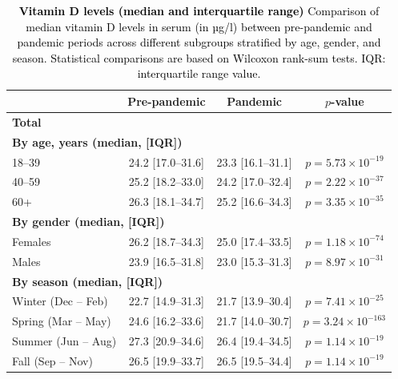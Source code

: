 \documentclass[12pt]{article}
\newcommand{\REV}[1]{\textcolor{black}{#1}}
\begin{document}
\begin{appendices}
\begin{table}[h]
    \centering
\caption[Vitamin D levels (median and interquartile range)]{\REV{\textbf{Vitamin D levels (median and interquartile range)} Comparison of median vitamin D levels in serum (in µg/l) between pre-pandemic and pandemic periods across different subgroups stratified by age, gender, and season. Statistical comparisons are based on Wilcoxon rank-sum tests. IQR: interquartile range value.}}
\label{tab:results_stat_level_median}
    \begin{tabular}{|l|c|c|c|}
    \hline
    \rowcolor{orange!20} & \textbf{Pre-pandemic} & \textbf{Pandemic} & \textbf{$p$-value}\\ \hline 
    \textbf{Total}& & & \\ \hline
    \multicolumn{4}{|l|}{\textbf{By age, years (median, [IQR])}} \\\hline
    18--39 & 24.2 [17.0--31.6] & 23.3 [16.1--31.1] & $p = 5.73 \times 10^{-19}$\\ \hline
    40--59 & 25.2 [18.2--33.0] & 24.2 [17.0--32.4] & $p = 2.22 \times 10^{-37}$\\ \hline
    60+ & 26.3 [18.1--34.7] & 25.2 [16.6--34.3] & $p = 3.35 \times 10^{-35}$\\ \hline
    \multicolumn{4}{|l|}{\textbf{By gender (median, [IQR])}} \\ \hline
    Females& 26.2 [18.7--34.3] & 25.0 [17.4--33.5] & $p = 1.18 \times 10^{-74}$\\ \hline
    Males& 23.9 [16.5--31.8] & 23.0 [15.3--31.3] & $p = 8.97 \times 10^{-31}$\\ \hline
    \multicolumn{4}{|l|}{\textbf{By season (median, [IQR])}} \\ \hline 
 Winter (Dec -- Feb)& 22.7 [14.9--31.3] & 21.7 [13.9--30.4] & $p = 7.41 \times 10^{-25}$\\ \hline 
 Spring (Mar -- May)& 24.6 [16.2--33.6] & 21.7 [14.0--30.7] & $p = 3.24 \times 10^{-163}$\\ \hline 
 Summer (Jun -- Aug)& 27.3 [20.9--34.6] & 26.4 [19.4--34.5] & $p = 1.14 \times 10^{-19}$\\ \hline 
 Fall (Sep -- Nov)& 26.5 [19.9--33.7] & 26.5 [19.5--34.4] & $p = 1.14 \times 10^{-19}$\\ \hline
\end{tabular}
\end{table}



\newpage



\end{appendices}
\end{document}
